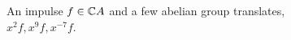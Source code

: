 \begin{figure}
\centerline{}
  \caption{An impulse $f\in \mathbb{C} A$ and a few abelian group translates, $x^2f, x^9f,
      x^{-7}f$.}
  \label{fig:cyclicshift}
\end{figure}






